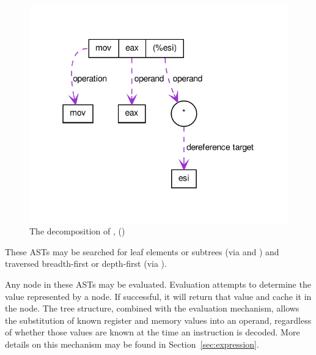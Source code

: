 \begin{figure}
    \centering
\includegraphics{fig/instruction_representation}
\caption{The decomposition of  , ()}
\label{fig:representation}
\end{figure}

These ASTs may be searched for leaf elements or subtrees (via 
 and ) and traversed breadth-\/first or depth-\/first
(via ).

Any node in these ASTs may be evaluated. Evaluation attempts to determine the
value represented by a node. If successful, it will return that value and cache
it in the node. The tree structure, combined with the evaluation mechanism,
allows the substitution of known register and memory values into an operand,
regardless of whether those values are known at the time an instruction is
decoded. More details on this mechanism may be found in
Section~\ref{sec:expression}.
